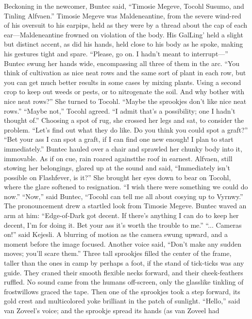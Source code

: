 \documentclass[9pt]{article}
\begin{document}
Beckoning in the newcomer, Buntec said, “Timosie Megeve, Tocohl Susumo, and Tinling Alfvaen.”
Timosie Megeve was Maldeneantine, from the severe wind-red of his oversuit to his earpips, held as
they were by a thread about the cap of each ear—Maldeneantine frowned on violation of the body. His
GalLing’ held a slight but distinct accent, as did his hands, held close to his body as he spoke, making his
gestures tight and spare. “Please, go on. I hadn’t meant to interrupt—”
Buntec swung her hands wide, encompassing all three of them in the arc. “You think of cultivation as
nice neat rows and the same sort of plant in each row, but you can get much better results in some cases
by mixing plants. Using a second crop to keep out weeds or pests, or to nitrogenate the soil. And why
bother with nice neat rows?” She turned to Tocohl. “Maybe the sprookjes don’t like nice neat rows.”
“Maybe not,” Tocohl agreed. “I admit that’s a possibility; one I hadn’t thought of.” Choosing a spot
of rug, she crossed her legs and sat, to consider the problem. “Let’s find out what they do like. Do you
think you could spot a graft?”
“Bet your ass I can spot a graft, if I can find one new enough! I plan to start immediately.” Buntec
hauled over a chair and sprawled her chunky body into it, immovable. As if on cue, rain roared againstthe roof in earnest.
Alfvaen, still stowing her belongings, glared up at the sound and said, “Immediately isn’t possible on
Flashfever, is it?” She brought her eyes down to bear on Tocohl, where the glare softened to resignation.
“I wish there were something we could do now.”
“Now,” said Buntec, “Tocohl can tell me all about cosying up to Vyrnwy.” The pronouncement drew
a startled look from Timosie Megeve. Buntec waved an arm at him: “Edge-of-Dark got decent. If there’s
anything I can do to keep her decent, I’m for doing it. Bet your ass it’s worth the trouble to me.”
“... Cameras on!” said Kejesli.
A blurring of motion as the camera swung upward, and a moment before the image focused.
Another voice said, “Don’t make any sudden moves; you’ll scare them.”
Three tall sprookjes filled the center of the frame, taller than the ones in camp by perhaps a foot, if
the stand of tick-ticks was any guide. They craned their smooth flexible necks forward, and their
cheek-feathers ruffled. No sound came from the humans off-screen, only the glasslike tinkling of
frostwillows graced the tape.
Then one of the sprookjes took a step forward, its gold crest and multicolored yoke brilliant in the
patch of sunlight. “Hello,” said van Zoveel’s voice; and the sprookje spread its hands (as van Zoveel had
\end{document}
